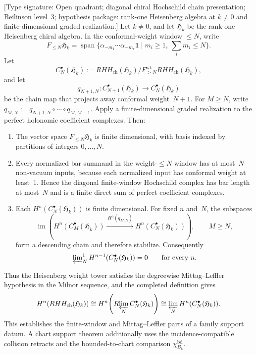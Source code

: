 \begin{proposition}
\label{prop:heisenberg-theorem-h-window-limit}
\textup{[Type signature: Open quadrant; diagonal chiral Hochschild
chain presentation; Beilinson level~$3$; hypothesis package:
rank-one Heisenberg algebra at $k\neq0$ and finite-dimensional graded
realization.]}
Let \(k\neq0\), and let \(\mathfrak H_k\) be the rank-one
Heisenberg chiral algebra.  In the conformal-weight window
\(\leq N\), write
\[
F_{\leq N}\mathfrak H_k
=
\operatorname{span}\{
\alpha_{-m_1}\cdots\alpha_{-m_r}\mathbf 1
\mid
m_i\geq1,\ \sum_i m_i\leq N
\}.
\]
Let
\[
 C_N^\bullet(\mathfrak H_k)
 :=RHH_{\mathrm{ch}}(\mathfrak H_k)/
 F_{>N}^{\mathrm{wt}}RHH_{\mathrm{ch}}(\mathfrak H_k),
\]
and let
\[
 q_{N+1,N}\colon C_{N+1}^\bullet(\mathfrak H_k)
 \longrightarrow C_N^\bullet(\mathfrak H_k)
\]
be the chain map that projects away conformal weight~$N+1$.
For $M\geq N$, write
$q_{M,N}:=q_{N+1,N}\circ\cdots\circ q_{M,M-1}$.
Apply a finite-dimensional graded realization to the perfect
holonomic coefficient complexes.  Then:
\begin{enumerate}[label=\textup{(\roman*)}]
\item The vector space \(F_{\leq N}\mathfrak H_k\) is finite
 dimensional, with basis indexed by partitions of integers
 \(0,\ldots,N\).
\item Every normalized bar summand in the weight-$\leq N$ window has
 at most~$N$ non-vacuum inputs, because each normalized input has
 conformal weight at least~$1$.  Hence the diagonal finite-window
 Hochschild complex has bar length at most~$N$ and is a finite direct
 sum of perfect coefficient complexes.
\item Each $H^n(C_N^\bullet(\mathfrak H_k))$ is finite dimensional.
 For fixed $n$ and~$N$, the subspaces
 \[
  \operatorname{im}\!\left(
   H^n(C_M^\bullet(\mathfrak H_k))
   \xrightarrow{\,H^n(q_{M,N})\,}
   H^n(C_N^\bullet(\mathfrak H_k))
  \right),
  \qquad M\geq N,
 \]
 form a descending chain and therefore stabilize.  Consequently
 \[
  \varprojlim\nolimits_N^1
  H^{n-1}(C_N^\bullet(\mathfrak H_k))=0
  \qquad\text{for every }n.
 \]
\end{enumerate}
Thus the Heisenberg weight tower satisfies the degreewise
Mittag--Leffler hypothesis in the Milnor sequence, and the completed
definition gives
\[
 H^n\!\left(RHH_{\mathrm{ch}}(\mathfrak H_k)\right)
 \cong
 H^n\!\left(R\!\varprojlim_N C_N^\bullet(\mathfrak H_k)\right)
 \cong
 \varprojlim_N H^n(C_N^\bullet(\mathfrak H_k)).
\]
This establishes the finite-window and Mittag--Leffler parts of a
family support datum.  A chart support theorem additionally uses the
incidence-compatible collision retracts and the bounded-to-chart
comparison \(\chi_{B_{\mathfrak h}}^{\mathrm{bd}}\).
\end{proposition}

